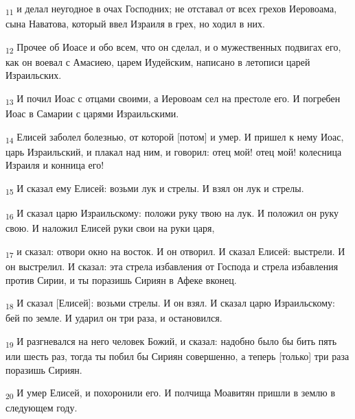 \begin{tcolorbox}
\textsubscript{11} и делал неугодное в очах Господних; не отставал от всех грехов Иеровоама, сына Наватова, который ввел Израиля в грех, но ходил в них.
\end{tcolorbox}
\begin{tcolorbox}
\textsubscript{12} Прочее об Иоасе и обо всем, что он сделал, и о мужественных подвигах его, как он воевал с Амасиею, царем Иудейским, написано в летописи царей Израильских.
\end{tcolorbox}
\begin{tcolorbox}
\textsubscript{13} И почил Иоас с отцами своими, а Иеровоам сел на престоле его. И погребен Иоас в Самарии с царями Израильскими.
\end{tcolorbox}
\begin{tcolorbox}
\textsubscript{14} Елисей заболел болезнью, от которой [потом] и умер. И пришел к нему Иоас, царь Израильский, и плакал над ним, и говорил: отец мой! отец мой! колесница Израиля и конница его!
\end{tcolorbox}
\begin{tcolorbox}
\textsubscript{15} И сказал ему Елисей: возьми лук и стрелы. И взял он лук и стрелы.
\end{tcolorbox}
\begin{tcolorbox}
\textsubscript{16} И сказал царю Израильскому: положи руку твою на лук. И положил он руку свою. И наложил Елисей руки свои на руки царя,
\end{tcolorbox}
\begin{tcolorbox}
\textsubscript{17} и сказал: отвори окно на восток. И он отворил. И сказал Елисей: выстрели. И он выстрелил. И сказал: эта стрела избавления от Господа и стрела избавления против Сирии, и ты поразишь Сириян в Афеке вконец.
\end{tcolorbox}
\begin{tcolorbox}
\textsubscript{18} И сказал [Елисей]: возьми стрелы. И он взял. И сказал царю Израильскому: бей по земле. И ударил он три раза, и остановился.
\end{tcolorbox}
\begin{tcolorbox}
\textsubscript{19} И разгневался на него человек Божий, и сказал: надобно было бы бить пять или шесть раз, тогда ты побил бы Сириян совершенно, а теперь [только] три раза поразишь Сириян.
\end{tcolorbox}
\begin{tcolorbox}
\textsubscript{20} И умер Елисей, и похоронили его. И полчища Моавитян пришли в землю в следующем году.
\end{tcolorbox}

